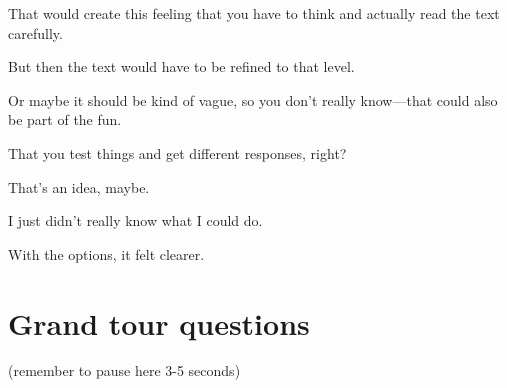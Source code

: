 \begin{QandA}
\begin{answered}
            That would create this feeling that you have to think and actually read the text carefully.

            But then the text would have to be refined to that level.

            Or maybe it should be kind of vague, so you don’t really know—that could also be part of the fun.

            That you test things and get different responses, right?

            That’s an idea, maybe.

            I just didn’t really know what I could do.

            With the options, it felt clearer.
         \end{answered}
\end{QandA}




\section{Grand tour questions}
(remember to pause here 3-5 seconds)

